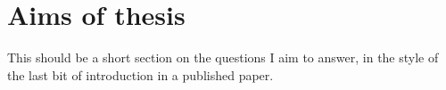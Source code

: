\section{Aims of thesis} %
\label{sec:intro-end}

This should be a short section on the questions I aim to answer, in the style of the last bit of introduction in a published paper.

